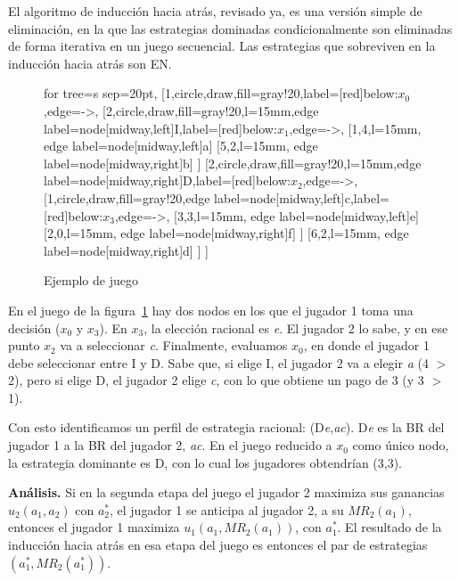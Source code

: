 \documentclass[12pt]{scrartcl}
\begin{document}
El algoritmo de inducción hacia atrás, revisado ya, es una versión simple de eliminación, en la que las estrategias dominadas condicionalmente son eliminadas de forma iterativa en un juego secuencial. Las estrategias que sobreviven en la inducción hacia atrás son EN. 

\begin{figure}[H]
	\centering
	\footnotesize{
		\begin{forest} for tree={s sep=20pt}, 
			[1,circle,draw,fill=gray!20,label={[red]below:$x_0$},edge={->},
				[2,circle,draw,fill=gray!20,l=15mm,edge label={node[midway,left]{I}},label={[red]below:$x_1$},edge={->},
					[{1,4},l=15mm, edge label={node[midway,left]{a}}]
					[{5,2},l=15mm, edge label={node[midway,right]{b}}]
				]
				[2,circle,draw,fill=gray!20,l=15mm,edge label={node[midway,right]{D}},label={[red]below:$x_2$},edge={->},
					[1,circle,draw,fill=gray!20,edge label={node[midway,left]{c}},label={[red]below:$x_3$},edge={->},
						[{3,3},l=15mm, edge label={node[midway,left]{e}}]
						[{2,0},l=15mm, edge label={node[midway,right]{f}}]
					]
					[{6,2},l=15mm, edge label={node[midway,right]{d}}]
				]
			]
		\end{forest}}
	\caption{Ejemplo de juego}
	\label{fig:fig5}
\end{figure}

En el juego de la figura~\ref{fig:fig5} hay dos nodos en los que el jugador 1 toma una decisión ($x_0$ y $x_3$). En $x_3$, la elección racional es \textit{e}. El jugador 2 lo sabe, y en ese punto $x_2$ va a seleccionar \textit{c}. Finalmente, evaluamos $x_0$, en donde el jugador 1 debe seleccionar entre I y D. Sabe que, si elige I, el jugador 2 va a elegir \textit{a} (4 $>$ 2), pero si elige D, el jugador 2 elige \textit{c}, con lo que obtiene un pago de 3 (y 3 $>$ 1). 

Con esto identificamos un perfil de estrategia racional: (D\textit{e},\textit{ac}). D\textit{e} es la BR del jugador 1 a la BR del jugador 2, \textit{ac}. En el juego reducido a $x_0$ como único nodo, la estrategia dominante es D, con lo cual los jugadores obtendrían (3,3).

\textbf{Análisis.} Si en la segunda etapa del juego el jugador 2 maximiza sus ganancias $u_2(a_1, a_2)$ con $a_2^*$, el jugador 1 se anticipa al jugador 2, a su $MR_2(a_1)$, entonces el jugador 1 maximiza $u_1(a_1, MR_2(a_1))$, con $a_1^*$. El resultado de la inducción hacia atrás en esa etapa del juego es entonces el par de estrategias $(a_1^*, MR_2(a_1^*))$.
\end{document}
